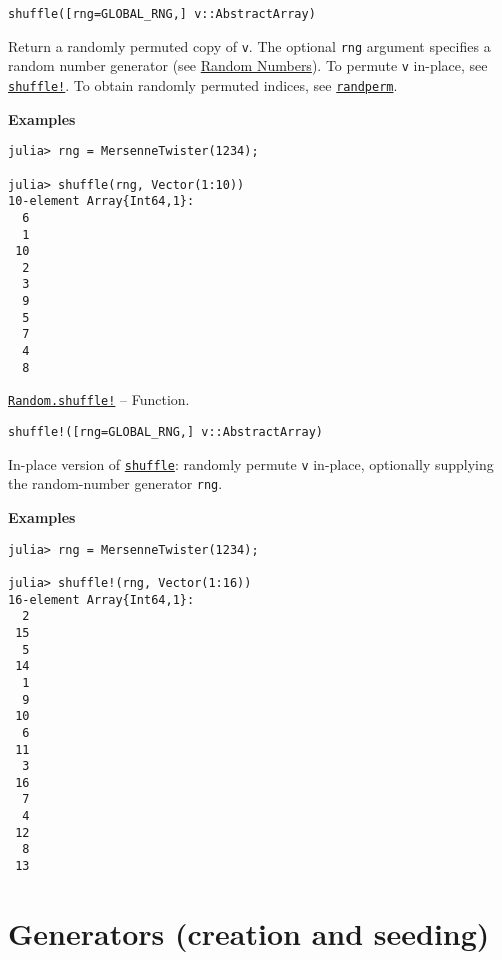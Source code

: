 \begin{adjustwidth}{2em}{0pt}


\begin{verbatim}
shuffle([rng=GLOBAL_RNG,] v::AbstractArray)
\end{verbatim}

Return a randomly permuted copy of \texttt{v}. The optional \texttt{rng} argument specifies a random number generator (see \hyperlink{16621464973028186601}{Random Numbers}). To permute \texttt{v} in-place, see \hyperlink{15315300334019616632}{\texttt{shuffle!}}. To obtain randomly permuted indices, see \hyperlink{7342203624124611352}{\texttt{randperm}}.

\textbf{Examples}


\begin{verbatim}
julia> rng = MersenneTwister(1234);

julia> shuffle(rng, Vector(1:10))
10-element Array{Int64,1}:
  6
  1
 10
  2
  3
  9
  5
  7
  4
  8
\end{verbatim}



\end{adjustwidth}
\hypertarget{15315300334019616632}{} 
\hyperlink{15315300334019616632}{\texttt{Random.shuffle!}}  -- {Function.}

\begin{adjustwidth}{2em}{0pt}


\begin{verbatim}
shuffle!([rng=GLOBAL_RNG,] v::AbstractArray)
\end{verbatim}

In-place version of \hyperlink{16742615893822221762}{\texttt{shuffle}}: randomly permute \texttt{v} in-place, optionally supplying the random-number generator \texttt{rng}.

\textbf{Examples}


\begin{verbatim}
julia> rng = MersenneTwister(1234);

julia> shuffle!(rng, Vector(1:16))
16-element Array{Int64,1}:
  2
 15
  5
 14
  1
  9
 10
  6
 11
  3
 16
  7
  4
 12
  8
 13
\end{verbatim}



\end{adjustwidth}

\hypertarget{16600936393177391619}{}


\section{Generators (creation and seeding)}


